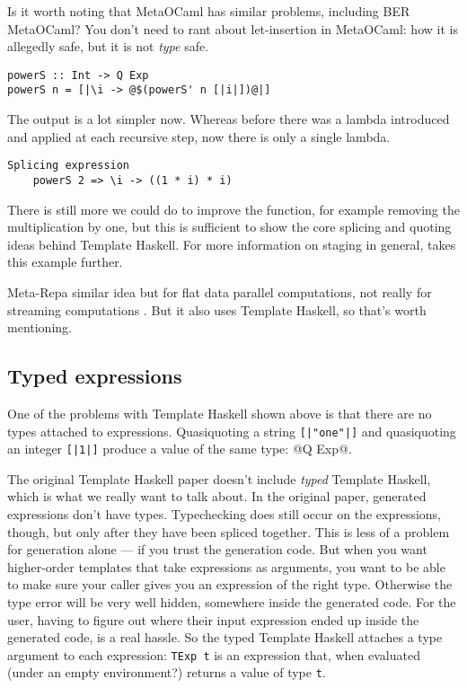 Is it worth noting that MetaOCaml has similar problems, including BER MetaOCaml?
You don't need to rant about let-insertion in MetaOCaml: how it is allegedly safe, but it is not \emph{type} safe.

\begin{lstlisting}
powerS :: Int -> Q Exp
powerS n = [|\i -> @$(powerS' n [|i|])@|]
\end{lstlisting}

The output is a lot simpler now.
Whereas before there was a lambda introduced and applied at each recursive step, now there is only a single lambda.

\begin{lstlisting}
Splicing expression
    powerS 2 => \i -> ((1 * i) * i)
\end{lstlisting}

There is still more we could do to improve the function, for example removing the multiplication by one, but this is sufficient to show the core splicing and quoting ideas behind Template Haskell.
For more information on staging in general, \citet{rompf2010lightweight} takes this example further.

Meta-Repa similar idea but for flat data parallel computations, not really for streaming computations \cite{ankner2013edsl}.
But it also uses Template Haskell, so that's worth mentioning.

\subsection{Typed expressions}

One of the problems with Template Haskell shown above is that there are no types attached to expressions.
Quasiquoting a string \lstinline/[|"one"|]/ and quasiquoting an integer \lstinline/[|1|]/ produce a value of the same type: @Q Exp@.

The original Template Haskell paper  doesn't include \emph{typed} Template Haskell, which is what we really want to talk about.
In the original paper, generated expressions don't have types.
Typechecking does still occur on the expressions, though, but only after they have been spliced together.
This is less of a problem for generation alone --- if you trust the generation code.
But when you want higher-order templates that take expressions as arguments, you want to be able to make sure your caller gives you an expression of the right type.
Otherwise the type error will be very well hidden, somewhere inside the generated code.
For the user, having to figure out where their input expression ended up inside the generated code, is a real hassle.
So the typed Template Haskell attaches a type argument to each expression: \lstinline|TExp t| is an expression that, when evaluated (under an empty environment?) returns a value of type \lstinline|t|.

